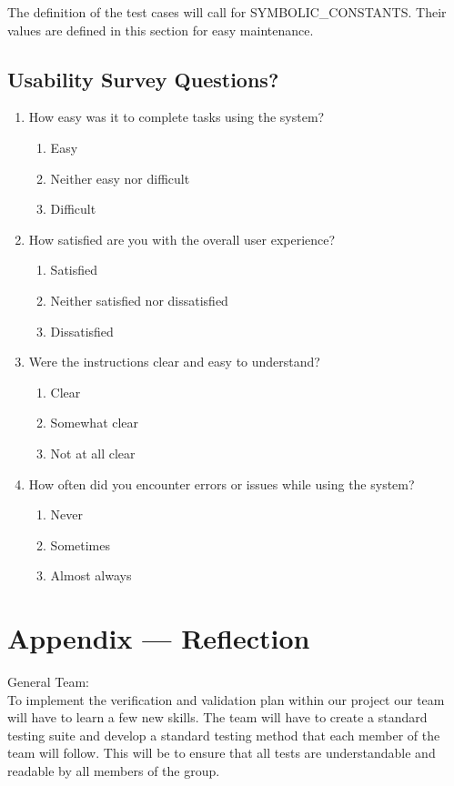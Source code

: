 \documentclass[12pt, titlepage]{article}
\begin{document}
The definition of the test cases will call for SYMBOLIC\_CONSTANTS.
Their values are defined in this section for easy maintenance.

\subsection{Usability Survey Questions?}

\begin{enumerate}

\item How easy was it to complete tasks using the system?
\begin{enumerate}
\item Easy
\item Neither easy nor difficult
\item Difficult
\end{enumerate}

\item How satisfied are you with the overall user experience?
\begin{enumerate}
\item Satisfied
\item Neither satisfied nor dissatisfied
\item Dissatisfied
\end{enumerate}

\item Were the instructions clear and easy to understand?
\begin{enumerate}
\item Clear
\item Somewhat clear
\item Not at all clear
\end{enumerate}

\item How often did you encounter errors or issues while using the system?
\begin{enumerate}
\item Never
\item Sometimes
\item Almost always
\end{enumerate}
\end{enumerate}
\newpage{}
\section*{Appendix --- Reflection}
General Team:\\

\noindent To implement the verification and validation plan within our project our team will have to learn a few new skills. The team will have to create a standard testing suite and develop a standard testing method that each member of the team will follow. This will be to ensure that all tests are understandable and readable by all members of the group. \\
\end{document}
